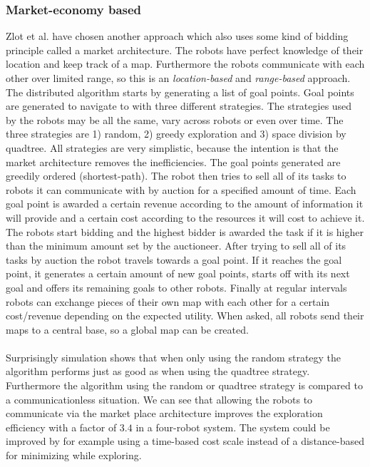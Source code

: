 	\subsubsection{Market-economy based}
	Zlot et al. have chosen another approach which also uses some kind of bidding principle called a market architecture. \cite{zlot2002multi}
	The robots have perfect knowledge of their location and keep track of a map.
	Furthermore the robots communicate with each other over limited range, so this is an \emph{location-based} and \emph{range-based} approach.
	The distributed algorithm starts by generating a list of goal points.
	Goal points are generated to navigate to with three different strategies.
	The strategies used by the robots may be all the same, vary across robots or even over time.
	The three strategies are 1) random, 2) greedy exploration and 3) space division by quadtree.
	All strategies are very simplistic, because the intention is that the market architecture removes the inefficiencies.
	The goal points generated are greedily ordered (shortest-path).
	The robot then tries to sell all of its tasks to robots it can communicate with by auction for a specified amount of time.
	Each goal point is awarded a certain revenue according to the amount of information it will provide and a certain cost according to the resources it will cost to achieve it.
	The robots start bidding and the highest bidder is awarded the task if it is higher than the minimum amount set by the auctioneer.
	After trying to sell all of its tasks by auction the robot travels towards a goal point.
	If it reaches the goal point, it generates a certain amount of new goal points, starts off with its next goal and offers its remaining goals to other robots.
	Finally at regular intervals robots can exchange pieces of their own map with each other for a certain cost/revenue depending on the expected utility.
	When asked, all robots send their maps to a central base, so a global map can be created.\\
	\\
	Surprisingly simulation shows that when only using the random strategy the algorithm performs just as good as when using the quadtree strategy.
	Furthermore the algorithm using the random or quadtree strategy is compared to a communicationless situation.
	We can see that allowing the robots to communicate via the market place architecture improves the exploration efficiency with a factor of $3.4$ in a four-robot system.
	The system could be improved by for example using a time-based cost scale instead of a distance-based for minimizing while exploring.

